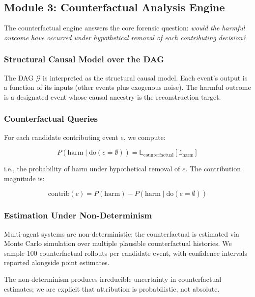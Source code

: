 \documentclass[sigconf,nonacm]{acmart}
\begin{document}
\subsection{Module 3: Counterfactual Analysis Engine}

The counterfactual engine answers the core forensic question:
\emph{would the harmful outcome have occurred under hypothetical
removal of each contributing decision?}

\subsubsection{Structural Causal Model over the DAG}

The DAG $\mathcal{G}$ is interpreted as the structural causal
model. Each event's output is a function of its inputs (other
events plus exogenous noise). The harmful outcome is a designated
event whose causal ancestry is the reconstruction target.

\subsubsection{Counterfactual Queries}

For each candidate contributing event $e$, we compute:

\begin{equation}
  P(\text{harm} \mid \text{do}(e = \emptyset)) = \mathbb{E}_{\text{counterfactual}}[\mathbb{1}_{\text{harm}}]
\end{equation}

i.e., the probability of harm under hypothetical removal of $e$.
The contribution magnitude is:

\begin{equation}
  \text{contrib}(e) = P(\text{harm}) - P(\text{harm} \mid \text{do}(e = \emptyset))
\end{equation}

\subsubsection{Estimation Under Non-Determinism}

Multi-agent systems are non-deterministic; the counterfactual is
estimated via Monte Carlo simulation over multiple plausible
counterfactual histories. We sample 100 counterfactual rollouts per
candidate event, with confidence intervals reported alongside point
estimates.

The non-determinism produces irreducible uncertainty in
counterfactual estimates; we are explicit that attribution is
probabilistic, not absolute.
\end{document}
